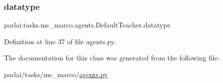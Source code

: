 \subsubsection{\texorpdfstring{datatype}{datatype}}
{\footnotesize\ttfamily parlai.\+tasks.\+ms\+\_\+marco.\+agents.\+Default\+Teacher.\+datatype}



Definition at line 37 of file agents.\+py.



The documentation for this class was generated from the following file\+:\begin{DoxyCompactItemize}
\item 
parlai/tasks/ms\+\_\+marco/\hyperlink{parlai_2tasks_2ms__marco_2agents_8py}{agents.\+py}\end{DoxyCompactItemize}
